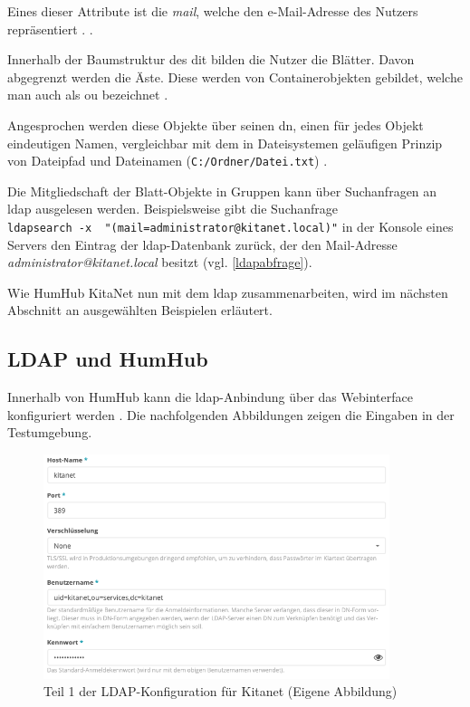 Eines dieser Attribute ist \zb die \textit{mail}, welche den e-Mail-Adresse des Nutzers repräsentiert \citep[][18]{rfc4519}.
 \citep[][615]{Deimeke2019}.

Innerhalb der Baumstruktur des \ac{dit} bilden die Nutzer die Blätter. Davon abgegrenzt werden die Äste. Diese werden von Containerobjekten gebildet, welche man auch als \ac{ou} bezeichnet \citep[vgl.][614]{Deimeke2019}.

Angesprochen werden diese Objekte über seinen \ac{dn}, einen für jedes Objekt eindeutigen Namen, vergleichbar mit dem in Dateisystemen geläufigen Prinzip von Dateipfad und Dateinamen (\zb \verb+C:/Ordner/Datei.txt+) \citep[vgl.][613]{Deimeke2019}. 

Die Mitgliedschaft der Blatt-Objekte in Gruppen kann über Suchanfragen an \ac{ldap} ausgelesen werden. Beispielsweise gibt die Suchanfrage\\ \verb+ldapsearch -x  "(mail=administrator@kitanet.local)"+ in der Konsole eines Servers den Eintrag der \ac{ldap}-Datenbank zurück, der den Mail-Adresse \textit{administrator@kitanet.local} besitzt (vgl. \autoref{ldapabfrage}).

Wie HumHub \bzw KitaNet nun mit dem \ac{ldap} zusammenarbeiten, wird im nächsten Abschnitt an ausgewählten Beispielen erläutert.

\subsection{LDAP und HumHub}

Innerhalb von HumHub kann die \ac{ldap}-Anbindung über das Webinterface konfiguriert werden \citep[vgl.][]{humldap}. Die nachfolgenden Abbildungen zeigen die Eingaben in der Testumgebung. 

\begin{figure}[H]
  \centering
  \includegraphics[width=0.9\textwidth]{res/ldapkitanet1.png}
  \caption{Teil 1 der LDAP-Konfiguration für Kitanet (Eigene Abbildung)}
  \label{fig:LDAP Kitanet Teil 1}
\end{figure}

